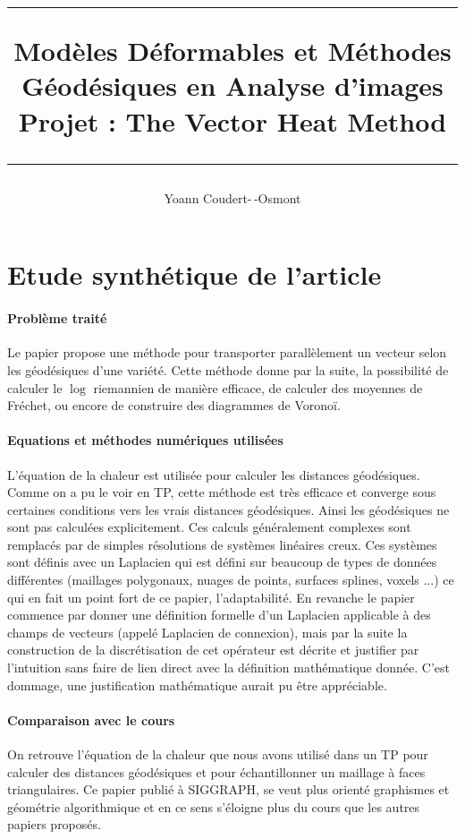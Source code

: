\documentclass[11pt]{article}
\title{
	\noindent\rule{\linewidth}{0.4pt}
	{ \huge Modèles Déformables et Méthodes Géodésiques en Analyse d’images } \\
	Projet : The Vector Heat Method \cite{VHM}
	\noindent\rule{\linewidth}{1pt}
}
\author{Yoann Coudert-\,-Osmont}
\begin{document}
	
	\maketitle
	
	\section{Etude synthétique de l'article}
	
	\paragraph{Problème traité}
	Le papier propose une méthode pour transporter parallèlement un vecteur selon les géodésiques d'une variété. Cette méthode donne par la suite, la possibilité de calculer le $\log$ riemannien de manière efficace, de calculer des moyennes de Fréchet, ou encore de construire des diagrammes de Voronoï.
	
	\paragraph{Equations et méthodes numériques utilisées}
	L'équation de la chaleur est utilisée pour calculer les distances géodésiques. Comme on a pu le voir en TP, cette méthode est très efficace et converge sous certaines conditions vers les vrais distances géodésiques. Ainsi les géodésiques ne sont pas calculées explicitement. Ces calculs généralement complexes sont remplacés par de simples résolutions de systèmes linéaires creux. Ces systèmes sont définis avec un Laplacien qui est défini sur beaucoup de types de données différentes (maillages polygonaux, nuages de points, surfaces splines, voxels ...) ce qui en fait un point fort de ce papier, l'adaptabilité. En revanche le papier commence par donner une définition formelle d'un Laplacien applicable à des champs de vecteurs (appelé Laplacien de connexion), mais par la suite la construction de la discrétisation de cet opérateur est décrite et justifier par l'intuition sans faire de lien direct avec la définition mathématique donnée. C'est dommage, une justification mathématique aurait pu être appréciable.
	
	\paragraph{Comparaison avec le cours}
	On retrouve l'équation de la chaleur que nous avons utilisé dans un TP pour calculer des distances géodésiques et pour échantillonner un maillage à faces triangulaires. Ce papier publié à SIGGRAPH, se veut plus orienté graphismes et géométrie algorithmique et en ce sens s'éloigne plus du cours que les autres papiers proposés.
	
\end{document}
